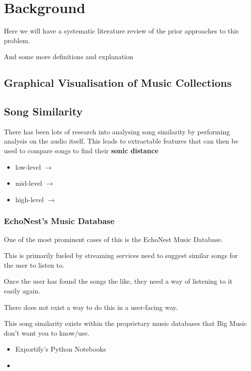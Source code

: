 \chapter{Background}
Here we will have a systematic literature review of the prior
approaches to this problem.

And some more definitions and explanation

\section{Graphical Visualisation of Music Collections}

\section{Song Similarity}
There has been lots of research into analysing song similarity by performing analysis on the audio itself. This leads to extractable features that can then be used to compare songs to find their \textbf{sonic distance}\begin{itemize}
    \item low-level \(\to\) 
    \item mid-level \(\to\) 
    \item high-level \(\to\) 
\end{itemize}

\subsection{EchoNest's Music Database}
One of the most prominent cases of this is the EchoNest Music Database.

This is primarily fueled by streaming services need to suggest similar songs for the user to listen to.

Once the user has found the songs the like, they need a way of listening to it easily again.

There does not exist a way to do this in a user-facing way.

This song similarity exists within the proprietary music databases that Big Music don't want you to know/use.

\begin{itemize}
    \item Exportify's Python Notebooks
    \item 
\end{itemize}

\section{}
